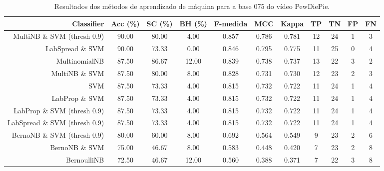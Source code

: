 \begin{table}[!htb]
\centering
\caption{Resultados dos métodos de aprendizado de máquina para a base 075 do vídeo PewDiePie.}
\label{tab:PewDiePie-075}
\begin{tabular}{r|c|c|c|c|c|c|c|c|c|c}
\hline\hline
Classifier & Acc (\%) & SC (\%) & BH (\%) & F-medida & MCC & Kappa & TP & TN & FP & FN \\ \hline
MultiNB \& SVM (thresh 0.9) & 90.00 & 80.00 & 4.00 & 0.857 & 0.786 & 0.781 & 12 & 24 & 1 & 3 \\ 
LabSpread \& SVM & 90.00 & 73.33 & 0.00 & 0.846 & 0.795 & 0.775 & 11 & 25 & 0 & 4 \\ 
MultinomialNB & 87.50 & 86.67 & 12.00 & 0.839 & 0.738 & 0.737 & 13 & 22 & 3 & 2 \\ 
MultiNB \& SVM & 87.50 & 80.00 & 8.00 & 0.828 & 0.731 & 0.730 & 12 & 23 & 2 & 3 \\ 
SVM & 87.50 & 73.33 & 4.00 & 0.815 & 0.732 & 0.722 & 11 & 24 & 1 & 4 \\ 
LabProp \& SVM & 87.50 & 73.33 & 4.00 & 0.815 & 0.732 & 0.722 & 11 & 24 & 1 & 4 \\ 
LabProp \& SVM (thresh 0.9) & 87.50 & 73.33 & 4.00 & 0.815 & 0.732 & 0.722 & 11 & 24 & 1 & 4 \\ 
LabSpread \& SVM (thresh 0.9) & 87.50 & 73.33 & 4.00 & 0.815 & 0.732 & 0.722 & 11 & 24 & 1 & 4 \\ 
BernoNB \& SVM (thresh 0.9) & 80.00 & 60.00 & 8.00 & 0.692 & 0.564 & 0.549 & 9 & 23 & 2 & 6 \\ 
BernoNB \& SVM & 75.00 & 46.67 & 8.00 & 0.583 & 0.448 & 0.420 & 7 & 23 & 2 & 8 \\ 
BernoulliNB & 72.50 & 46.67 & 12.00 & 0.560 & 0.388 & 0.371 & 7 & 22 & 3 & 8 \\ 
\hline\hline
\end{tabular}
\end{table}
